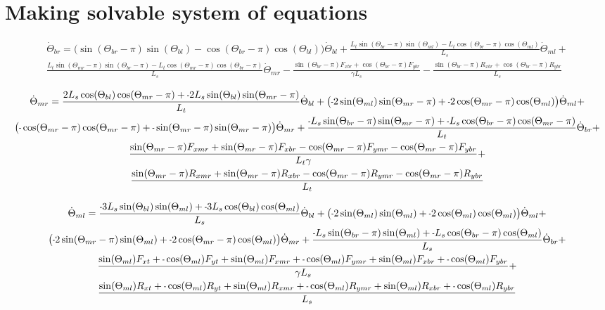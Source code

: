 \documentclass[11pt, landscape]{article}
\newcommand{\mn}{\scalebox{0.7}[1.0]{-}}
\begin{document}
\section{Making solvable system of equations}

\begin{multline}
\dot{\Theta}_{br} =
\big(\sin(\Theta_{br}-\pi)\sin(\Theta_{bl}) - \cos(\Theta_{br}-\pi)\cos(\Theta_{bl})\big)\dot{\Theta}_{bl} + 
\frac{L_{t}\sin(\Theta_{br}-\pi)\sin(\Theta_{ml}) - L_{t}\cos(\Theta_{br}-\pi)\cos(\Theta_{ml})}{L_{s}}\dot{\Theta}_{ml}  + \\
\frac{L_{t}\sin(\Theta_{mr}-\pi)\sin(\Theta_{br}-\pi) - L_{t}\cos(\Theta_{mr}-\pi)\cos(\Theta_{br}-\pi)}{L_{s}}\dot{\Theta}_{mr} - 
\frac{\sin(\Theta_{br}-\pi)F_{xbr} + \cos(\Theta_{br}-\pi)F_{ybr}}{\gamma L_{s}} - 
\frac{\sin(\Theta_{br}-\pi)R_{xbr} + \cos(\Theta_{br}-\pi)R_{ybr}}{L_{s}}
\end{multline}


\begin{multline}
\dot{\Theta}_{mr} =
\frac{2L_{s}\cos(\Theta_{bl})\cos(\Theta_{mr}-\pi) + \mn 2L_{s}\sin(\Theta_{bl})\sin(\Theta_{mr}-\pi)}{L_{t}}\dot{\Theta}_{bl} + 
\big(\mn 2\sin(\Theta_{ml})\sin(\Theta_{mr}-\pi) + \mn 2\cos(\Theta_{mr}-\pi)\cos(\Theta_{ml}) \big)\dot{\Theta}_{ml} + \\
\big( \mn \cos(\Theta_{mr}-\pi)\cos(\Theta_{mr}-\pi) + \mn\sin(\Theta_{mr}-\pi)\sin(\Theta_{mr}-\pi)\big)\dot{\Theta}_{mr} + 
\frac{\mn L_{s}\sin(\Theta_{br}-\pi)\sin(\Theta_{mr}-\pi) + \mn L_{s}\cos(\Theta_{br}-\pi)\cos(\Theta_{mr}-\pi)}{L_{t}}\dot{\Theta}_{br} + \\
\frac{\sin(\Theta_{mr}-\pi)F_{xmr} + \sin(\Theta_{mr}-\pi)F_{xbr} - \cos(\Theta_{mr}-\pi)F_{ymr} - \cos(\Theta_{mr}-\pi)F_{ybr}}{L_{t}\gamma} + \\
\frac{\sin(\Theta_{mr}-\pi)R_{xmr} + \sin(\Theta_{mr}-\pi)R_{xbr} - \cos(\Theta_{mr}-\pi)R_{ymr} - \cos(\Theta_{mr}-\pi)R_{ybr}}{L_{t}}
\end{multline}



\begin{multline}
\dot{\Theta}_{ml} =
\frac{\mn 3L_{s}\sin(\Theta_{bl})\sin(\Theta_{ml}) + \mn3L_{s}\cos(\Theta_{bl})\cos(\Theta_{ml})}{L_s}\dot{\Theta}_{bl} + 
\big(\mn 2\sin(\Theta_{ml})\sin(\Theta_{ml}) + \mn 2\cos(\Theta_{ml})\cos(\Theta_{ml}) \big)\dot{\Theta}_{ml} + \\
\big(\mn 2\sin(\Theta_{mr}-\pi)\sin(\Theta_{ml}) + \mn 2\cos(\Theta_{mr}-\pi)\cos(\Theta_{ml}) \big)\dot{\Theta}_{mr} + 
\frac{\mn L_{s}\sin(\Theta_{br}-\pi)\sin(\Theta_{ml}) + \mn L_{s}\cos(\Theta_{br}-\pi)\cos(\Theta_{ml})}{L_s}\dot{\Theta}_{br} + \\
\frac{\sin(\Theta_{ml})F_{xt } + \mn \cos(\Theta_{ml})F_{yt } + \sin(\Theta_{ml})F_{xmr} + \mn \cos(\Theta_{ml})F_{ymr} + \sin(\Theta_{ml})F_{xbr} + \mn \cos(\Theta_{ml})F_{ybr}}{\gamma L_s} + \\
\frac{\sin(\Theta_{ml})R_{xt } + \mn \cos(\Theta_{ml})R_{yt } + \sin(\Theta_{ml})R_{xmr} + \mn \cos(\Theta_{ml})R_{ymr} + \sin(\Theta_{ml})R_{xbr} + \mn \cos(\Theta_{ml})R_{ybr}}{L_s}
\end{multline}
\end{document}
